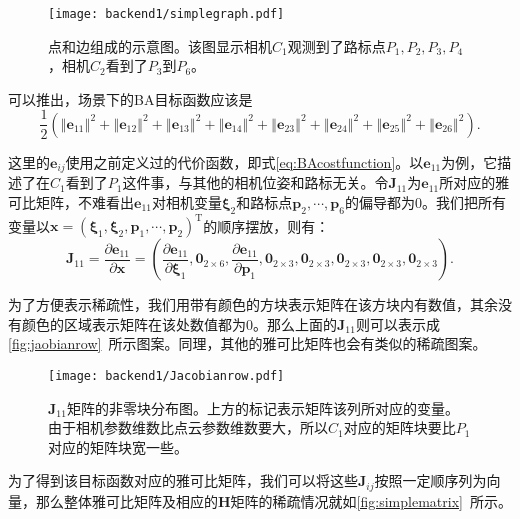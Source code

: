 \begin{figure}[!htp]
	\centering
	\texttt{[image: backend1/simplegraph.pdf]}
	\caption{点和边组成的示意图。该图显示相机$C_1$观测到了路标点$P_1,P_2,P_3,P_4$，相机$C_2$看到了$P_3$到$P_6$。}
	\label{fig:simplegraph}
\end{figure}

可以推出，场景下的BA目标函数应该是
\begin{equation}
\frac{1}{2}\left( \left\Vert \bm{e}_{11} \right\Vert^2 + 
\left\Vert \bm{e}_{12} \right\Vert^2 + 
\left\Vert \bm{e}_{13} \right\Vert^2 + 
\left\Vert \bm{e}_{14} \right\Vert^2 + 
\left\Vert \bm{e}_{23} \right\Vert^2 + 
\left\Vert \bm{e}_{24} \right\Vert^2 + 
\left\Vert \bm{e}_{25} \right\Vert^2 + 
\left\Vert \bm{e}_{26} \right\Vert^2 
\right).
\end{equation}

这里的$\bm{e}_{ij}$使用之前定义过的代价函数，即式\eqref{eq:BAcostfunction}。以$\bm{e}_{11}$为例，它描述了在$C_1$看到了$P_1$这件事，与其他的相机位姿和路标无关。令$\bm{J}_{11}$为$\bm{e}_{11}$所对应的雅可比矩阵，不难看出$\bm{e}_{11}$对相机变量$\bm{\xi}_2$和路标点$\bm{p}_2, \cdots, \bm{p}_6$的偏导都为0。我们把所有变量以$\bm{x} = \left( \bm{\xi}_1, \bm{\xi}_2, \bm{p}_1, \cdots, \bm{p}_2 \right)^\mathrm{T}$的顺序摆放，则有：
\begin{equation}
\bm{J}_{11} = \frac{\partial \bm{e}_{11}}{\partial \bm{x}}
= \left(
\frac{\partial \bm{e}_{11}}{\partial \bm{\xi}_1},
\bm{0}_{2\times 6},
\frac{\partial \bm{e}_{11}}{\partial \bm{p}_1},
\bm{0}_{2\times 3},
\bm{0}_{2\times 3},
\bm{0}_{2\times 3},
\bm{0}_{2\times 3},
\bm{0}_{2\times 3}
\right).
\end{equation}

为了方便表示稀疏性，我们用带有颜色的方块表示矩阵在该方块内有数值，其余没有颜色的区域表示矩阵在该处数值都为0。那么上面的$\bm{J}_{11}$则可以表示成\autoref{fig:jaobianrow}~所示图案。同理，其他的雅可比矩阵也会有类似的稀疏图案。

\begin{figure}[!htp]
	\centering
	\texttt{[image: backend1/Jacobianrow.pdf]}
	\caption{$\bm{J}_{11}$矩阵的非零块分布图。上方的标记表示矩阵该列所对应的变量。由于相机参数维数比点云参数维数要大，所以$C_1$对应的矩阵块要比$P_1$对应的矩阵块宽一些。}
	\label{fig:jaobianrow}
\end{figure}

为了得到该目标函数对应的雅可比矩阵，我们可以将这些$\bm{J}_{ij}$按照一定顺序列为向量，那么整体雅可比矩阵及相应的$\bm{H}$矩阵的稀疏情况就如\autoref{fig:simplematrix}~所示。

